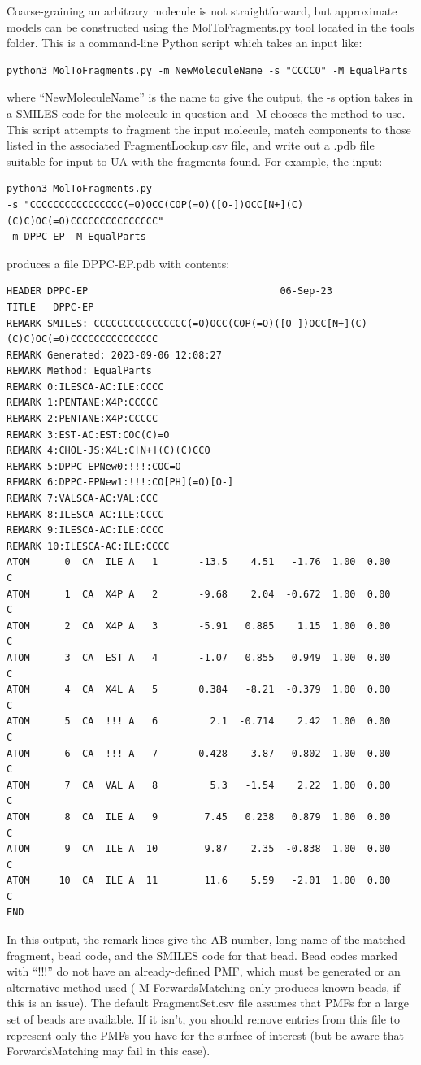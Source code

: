 \documentclass[10pt,a4paper,onecolumn]{report}
\begin{document}
Coarse-graining an arbitrary molecule is not straightforward, but approximate models can be constructed using the MolToFragments.py tool located in the tools folder. This is a command-line Python script which takes an input like:
\begin{lstlisting}
python3 MolToFragments.py -m NewMoleculeName -s "CCCCO" -M EqualParts
\end{lstlisting}
where ``NewMoleculeName'' is the name to give the output, the -s option takes in a SMILES code for the molecule in question and -M chooses the method to use. This script attempts to fragment the input molecule, match components to those listed in the associated FragmentLookup.csv file, and write out a .pdb file suitable for input to UA with the fragments found. For example, the input:
\begin{lstlisting}
python3 MolToFragments.py 
-s "CCCCCCCCCCCCCCCC(=O)OCC(COP(=O)([O-])OCC[N+](C)(C)C)OC(=O)CCCCCCCCCCCCCCC" 
-m DPPC-EP -M EqualParts
\end{lstlisting}
produces a file DPPC-EP.pdb with contents:
\begin{lstlisting}
HEADER DPPC-EP                                 06-Sep-23
TITLE   DPPC-EP
REMARK SMILES: CCCCCCCCCCCCCCCC(=O)OCC(COP(=O)([O-])OCC[N+](C)(C)C)OC(=O)CCCCCCCCCCCCCCC
REMARK Generated: 2023-09-06 12:08:27
REMARK Method: EqualParts
REMARK 0:ILESCA-AC:ILE:CCCC
REMARK 1:PENTANE:X4P:CCCCC
REMARK 2:PENTANE:X4P:CCCCC
REMARK 3:EST-AC:EST:COC(C)=O
REMARK 4:CHOL-JS:X4L:C[N+](C)(C)CCO
REMARK 5:DPPC-EPNew0:!!!:COC=O
REMARK 6:DPPC-EPNew1:!!!:CO[PH](=O)[O-]
REMARK 7:VALSCA-AC:VAL:CCC
REMARK 8:ILESCA-AC:ILE:CCCC
REMARK 9:ILESCA-AC:ILE:CCCC
REMARK 10:ILESCA-AC:ILE:CCCC
ATOM      0  CA  ILE A   1       -13.5    4.51   -1.76  1.00  0.00           C
ATOM      1  CA  X4P A   2       -9.68    2.04  -0.672  1.00  0.00           C
ATOM      2  CA  X4P A   3       -5.91   0.885    1.15  1.00  0.00           C
ATOM      3  CA  EST A   4       -1.07   0.855   0.949  1.00  0.00           C
ATOM      4  CA  X4L A   5       0.384   -8.21  -0.379  1.00  0.00           C
ATOM      5  CA  !!! A   6         2.1  -0.714    2.42  1.00  0.00           C
ATOM      6  CA  !!! A   7      -0.428   -3.87   0.802  1.00  0.00           C
ATOM      7  CA  VAL A   8         5.3   -1.54    2.22  1.00  0.00           C
ATOM      8  CA  ILE A   9        7.45   0.238   0.879  1.00  0.00           C
ATOM      9  CA  ILE A  10        9.87    2.35  -0.838  1.00  0.00           C
ATOM     10  CA  ILE A  11        11.6    5.59   -2.01  1.00  0.00           C
END
\end{lstlisting}
In this output, the remark lines give the AB number, long name of the matched fragment, bead code, and the SMILES code for that bead. Bead codes marked with ``!!!'' do not have an already-defined PMF, which must be generated or an alternative method used (-M ForwardsMatching only produces known beads, if this is an issue). The default FragmentSet.csv file assumes that PMFs for a large set of beads are available. If it isn't, you should remove entries from this file to represent only the PMFs you have for the surface of interest (but be aware that ForwardsMatching may fail in this case).
\end{document}
